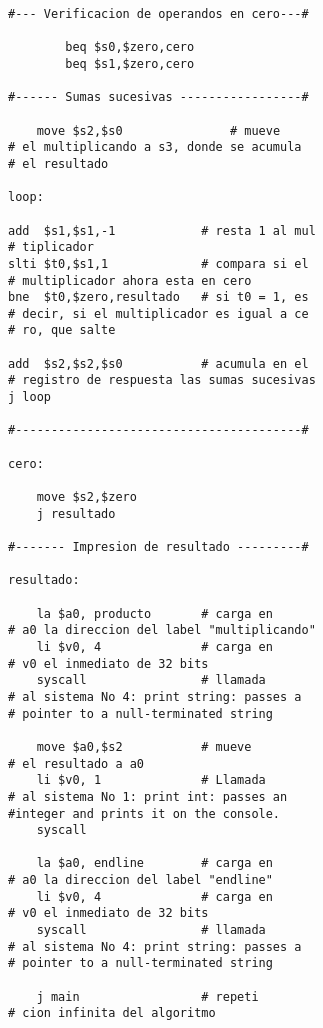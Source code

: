 \documentclass[twocolumn]{IEEEtran}
\begin{document}
\begin{lstlisting}[firstnumber=7, caption=Codigo inicial, label=code1]
#--- Verificacion de operandos en cero---#

        beq $s0,$zero,cero
        beq $s1,$zero,cero

#------ Sumas sucesivas -----------------#

	move $s2,$s0               # mueve
# el multiplicando a s3, donde se acumula 
# el resultado
 
loop:

add  $s1,$s1,-1            # resta 1 al mul
# tiplicador
slti $t0,$s1,1             # compara si el
# multiplicador ahora esta en cero
bne  $t0,$zero,resultado   # si t0 = 1, es
# decir, si el multiplicador es igual a ce
# ro, que salte
	
add  $s2,$s2,$s0           # acumula en el
# registro de respuesta las sumas sucesivas
j loop

#----------------------------------------#

cero:
	
	move $s2,$zero
	j resultado

#------- Impresion de resultado ---------#

resultado:

	la $a0, producto       # carga en  
# a0 la direccion del label "multiplicando"
	li $v0, 4              # carga en
# v0 el inmediato de 32 bits
	syscall                # llamada 
# al sistema No 4: print string: passes a
# pointer to a null-terminated string 

	move $a0,$s2           # mueve
# el resultado a a0
	li $v0, 1              # Llamada 
# al sistema No 1: print int: passes an 
#integer and prints it on the console. 
	syscall

	la $a0, endline        # carga en 
# a0 la direccion del label "endline"
	li $v0, 4              # carga en 
# v0 el inmediato de 32 bits
	syscall                # llamada 
# al sistema No 4: print string: passes a 
# pointer to a null-terminated string 

	j main                 # repeti
# cion infinita del algoritmo
\end{lstlisting}
\end{document}
